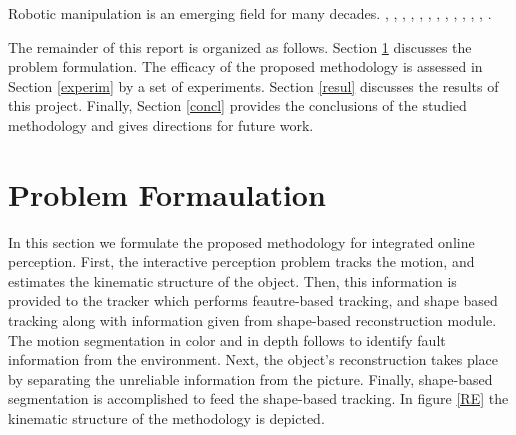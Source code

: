 \documentclass[letterpaper, 10 pt, conference]{ieeeconf}
\begin{document}
Robotic manipulation is an emerging field for many decades. \cite{chang2012interactive}, \cite{sturm2010vision}, \cite{katz2014interactive}, \cite{thrun2005probabilistic}, \cite{tomasi1991detection}, \cite{brock2009learning}, \cite{krainin2011manipulator}, \cite{wuthrich2013probabilistic}, \cite{choi2013rgb}, \cite{mishra2009active}, \cite{yuheng2013star3d}, \cite{herbst2014toward}, \cite{pomerleau2011tracking}.

The remainder of this report is organized as follows. Section \ref{pf} discusses the problem formulation. %
The efficacy of the proposed methodology is assessed in Section \ref{experim} by a set of experiments. Section \ref{resul} discusses the results of this project. Finally, Section \ref{concl} provides the conclusions of the studied methodology and gives directions for future work.  


\section{Problem Formaulation}\label{pf}
In this section we formulate the proposed methodology for integrated online perception. First, the interactive perception problem tracks the motion, and estimates the kinematic structure of the object. Then, this information is provided to the tracker which performs feautre-based tracking, and shape based tracking along with information given from shape-based reconstruction module. The motion segmentation in color and in depth follows to identify fault information from the environment. Next, the object's reconstruction takes place by separating the unreliable information from the picture. Finally, shape-based segmentation is accomplished to feed the shape-based tracking. In figure \ref{RE} the kinematic structure of the methodology is depicted. 
\end{document}
